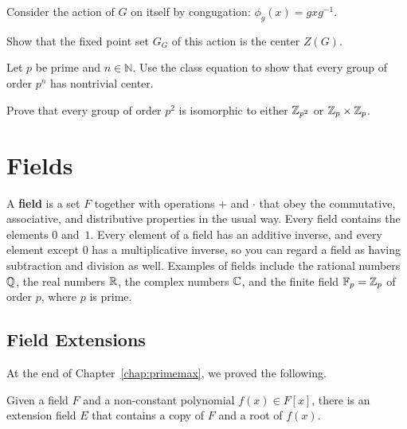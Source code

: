 \begin{problem}\label{prob:pnontrivz}
Consider the action of $G$ on itself by congugation: $\phi_g(x) = gxg^{-1}$.
\begin{problemparts}
 \item Show that the fixed point set $G_G$ of this action is the center $Z(G)$.
 \item Let $p$ be prime and $n\in \mathbb{N}$.  Use the class equation to show that every group of order $p^n$ has nontrivial center.
\end{problemparts}
\end{problem}

\begin{problem}\label{prob:p2group}
Prove that every group of order $p^2$ is isomorphic to either $\mathbb{Z}_{p^2}$ or $\mathbb{Z}_p\times \mathbb{Z}_p$.
\begin{annotation}
\end{annotation}
\end{problem}

\chapter{Fields}\label{chap:fields}

A \textbf{field} is a set $F$ together with operations $+$ and $\cdot$ that obey the commutative, associative, and distributive properties in the usual way. Every field contains the elements $0$ and~$1$. Every element of a field has an additive inverse, and every element except $0$ has a multiplicative inverse, so you can regard a field as having subtraction and division as well. Examples of fields include the rational numbers $\mathbb{Q}$, the real numbers $\mathbb{R}$, the complex numbers $\mathbb{C}$, and the finite field $\mathbb{F}_p = \mathbb{Z}_p$ of order $p$, where $p$ is prime.

\section{Field Extensions}

At the end of Chapter~\ref{chap:primemax}, we proved the following.

\begin{theorem}\label{thm:fieldext}
    Given a field $F$ and a non-constant polynomial $f(x)
    \in F[x]$, there is an extension field $E$ that contains a copy of $F$ and a root of $f(x)$.
\end{theorem}

